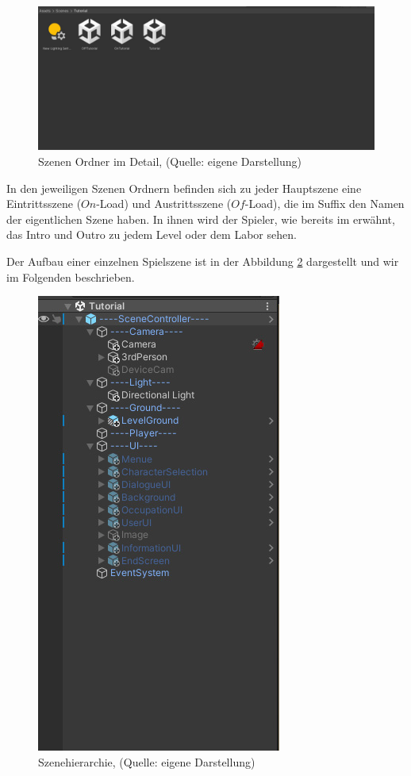 \begin{figure}[ht]
\centering
\includegraphics[width=1\linewidth]{content/pictures/Detail.jpg}
\caption{Szenen Ordner im Detail, (Quelle: eigene Darstellung)}
\label{fig:scenes_detail}
\end{figure}

In den jeweiligen Szenen Ordnern befinden sich zu jeder Hauptszene eine Eintrittsszene ($On$-Load) und Austrittsszene ($Of$-Load), die im Suffix den Namen der eigentlichen Szene  haben. In ihnen wird der Spieler, wie bereits im  erwähnt, das Intro und Outro zu jedem Level oder dem Labor sehen.

Der Aufbau einer einzelnen Spielszene ist in der Abbildung \ref{fig:scenes_hierachy}  dargestellt und wir im Folgenden beschrieben.
\begin{figure}[ht]
\centering
\includegraphics[width=0.3\linewidth]{content/pictures/Hierachie.jpg}
\caption{Szenehierarchie, (Quelle: eigene Darstellung)}
\label{fig:scenes_hierachy}
\end{figure}

